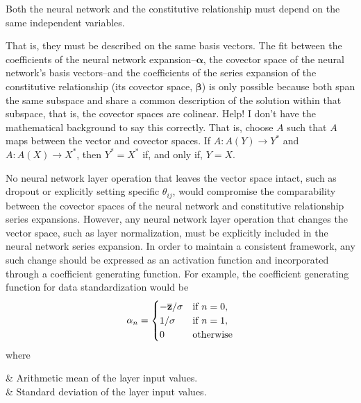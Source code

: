 \begin{condition}
    Both the neural network and the constitutive relationship must depend on the same independent variables.
\end{condition}
That is, they must be described on the same basis vectors. The fit between the coefficients of the neural network expansion--$\boldsymbol{\alpha}$, the covector space of the neural network's basis vectors--and the coefficients of the series expansion of the constitutive relationship (its covector space, $\boldsymbol{\beta}$) is only possible because both span the same subspace and share a common description of the solution within that subspace, that is, the covector spaces are colinear. {\color{red} Help! I don't have the mathematical background to say this correctly. That is, choose $A$ such that $A$ maps between the vector and covector spaces. If $A: A(Y) \to Y^*$ and $A: A(X) \to X^*$, then $Y^* = X^*$ if, and only if, $Y = X$.}

No neural network layer operation that leaves the vector space intact, such as dropout or explicitly setting specific $\theta_{ij}$, would compromise the comparability between the covector spaces of the neural network and constitutive relationship series expansions. However, any neural network layer operation that changes the vector space, such as layer normalization, must be explicitly included in the neural network series expansion. In order to maintain a consistent framework, any such change should be expressed as an activation function and incorporated through a coefficient generating function. For example, the coefficient generating function for data standardization would be
\begin{equation}
    \alpha_n = \begin{cases}
        -\overline{\bf z}/\sigma    & \mbox{if } n = 0, \\
        1/\sigma                   & \mbox{if } n = 1, \\
        0                           & \mbox{otherwise}
    \end{cases}
\end{equation}
where
\begin{conditions}
        & Arithmetic mean of the layer input values. \\
    \sigma              & Standard deviation of the layer input values.
\end{conditions}

